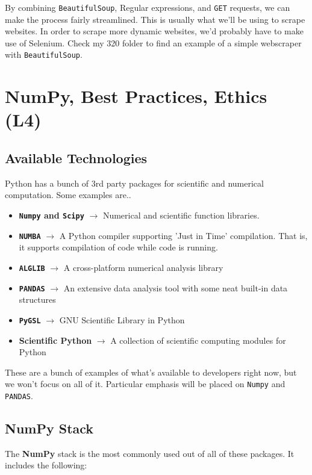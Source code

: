 \documentclass[english, 10pt]{article}
\begin{document}
By combining \texttt{BeautifulSoup}, Regular expressions, and \texttt{GET} requests, we can make the process fairly streamlined. This is usually what we'll be using to scrape websites. In order to scrape more dynamic websites, we'd probably have to make use of Selenium. Check my 320 folder to find an example of a simple webscraper with \texttt{BeautifulSoup}.

\section{NumPy, Best Practices, Ethics (L4)}

\subsection{Available Technologies}

Python has a bunch of 3rd party packages for scientific and numerical computation. Some examples are..

\begin{itemize}
	\item \textbf{\texttt{Numpy} and \texttt{Scipy}} $\rightarrow$ Numerical and scientific function libraries.
	\item \textbf{\texttt{NUMBA}} $\rightarrow$ A Python compiler supporting 'Just in Time' compilation. That is, it supports compilation of code while code is running.
	\item \textbf{\texttt{ALGLIB}} $\rightarrow$ A cross-platform numerical analysis library
	\item \textbf{\texttt{PANDAS}} $\rightarrow$ An extensive data analysis tool with some neat built-in data structures
	\item \textbf{\texttt{PyGSL}} $\rightarrow$ GNU Scientific Library in Python
	\item \textbf{Scientific Python} $\rightarrow$ A collection of scientific computing modules for Python
\end{itemize}

These are a bunch of examples of what's available to developers right now, but we won't focus on all of it. Particular emphasis will be placed on \texttt{Numpy} and \texttt{PANDAS}.

\subsection{NumPy Stack}

The \textbf{NumPy} stack is the most commonly used out of all of these packages. It includes the following:
\end{document}

